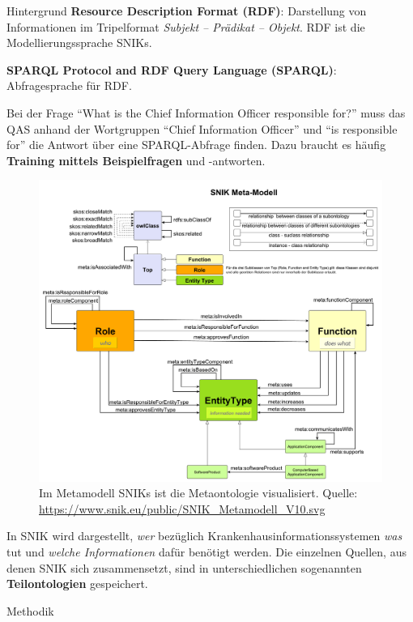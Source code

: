 \documentclass[portrait,final,a0paper,fontscale=0.320]{imiseposter}
\begin{document}
\begin{poster}
\begin{posterbox}[name=background,column=0,row=0]{Hintergrund}
\textbf{Resource Description Format (RDF)}: Darstellung von Informationen im Tripelformat \emph{Subjekt -- Prädikat --  Objekt}.
RDF ist die Modellierungssprache SNIKs.

\textbf{SPARQL Protocol and RDF Query Language (SPARQL)}: Abfragesprache für RDF.

Bei der Frage \enquote{What is the Chief Information Officer responsible for?} muss das QAS anhand der Wortgruppen \enquote{Chief Information Officer} und \enquote{is responsible for} die Antwort über eine SPARQL-Abfrage finden.
Dazu braucht es häufig \textbf{Training mittels Beispielfragen} und -antworten.

\begin{figure}[H]\includegraphics[width=\linewidth]{../Dokumentation/Images/snik-metamodel.pdf}\caption{Im Metamodell SNIKs ist die Metaontologie visualisiert. \small{Quelle: \protect\url{https://www.snik.eu/public/SNIK_Metamodell_V10.svg}}}\end{figure}
In SNIK wird dargestellt, \emph{wer} bezüglich Krankenhausinformationssystemen \emph{was} tut und \emph{welche Informationen} dafür benötigt werden.
Die einzelnen Quellen, aus denen SNIK sich zusammensetzt, sind in unterschiedlichen sogenannten \textbf{Teilontologien} gespeichert.

\end{posterbox}
\begin{posterbox}[name=methods,below=background]{Methodik}


\end{posterbox}
\end{poster}
\end{document}
